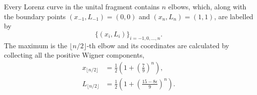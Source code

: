 Every Lorenz curve in the unital fragment contains $n$ elbows, which, along with the boundary points $(x_{-1}, L_{-1}) = (0,0)$ and $(x_{n}, L_{n}) = (1,1)$, are labelled by 
\begin{equation*}
\{(x_{i}, L_{i})\}_{i=-1,0,\dots,n}.
\end{equation*}
The maximum is the $\lfloor n/2 \rfloor$-th elbow and its coordinates are calculated by collecting all the positive Wigner components,
\begin{align}
	x_{\lfloor n/2 \rfloor} &= \frac{1}{2}\left(1 + \left(\frac{7}{9}\right)^n\right), \\
	L_{\lfloor n/2 \rfloor} &= \frac{1}{2}\left (1 + \left(\frac{15 - 8\epsilon}{9}\right)^n \right).
\end{align}


